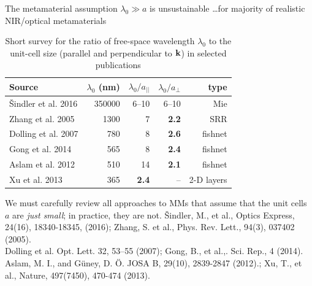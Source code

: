 \documentclass[t]{beamer} \usepackage[english]{babel} \usepackage[utf8]{inputenc} \usetheme{Frankfurt} %
\begin{document}
\begin{frame}{The metamaterial assumption $\lambda_0 \gg a$ is unsustainable}	%
	{\vspace{-.1em}\hfill \ldots for majority of realistic NIR/optical metamaterials}

\vspace{-1em}
\begin{table}[ht]   \caption{Short survey for the ratio of free-space wavelength $\lambda_0$ to the unit-cell size (parallel and perpendicular to ${\mathbf{k}}$) in selected publications}  \label{tb_} \centering 
\begin{tabular}{lrrrr}
\toprule
	Source		 & $\lambda_0$ (nm)	& $\lambda_0/a_{||}$  & $\lambda_0/a_{\perp}$ & type \\
\hline
Šindler et al. 2016  & 350000		&  6--10	& 6--10 & Mie \\
Zhang et al. 2005    & 1300			&  7        & \textbf{2.2}  & SRR \\
Dolling et al. 2007  & 780			&  8		& \textbf{2.6}  & fishnet \\
Gong et al. 2014     & 565			&  8		& \textbf{2.4}  & fishnet \\
Aslam et al. 2012    & 510			&  14		& \textbf{2.1}  & fishnet \\
Xu et al. 2013	     & 365		    & \textbf{2.4}		& --	& 2-D layers \\
\bottomrule
\end{tabular} \end{table}

\vspace{.5em}

We must carefully review all approaches to MMs that assume that the unit cells $a$ are \textit{just small}; in practice, they are not.
	\vfill
	\tiny{	
Šindler, M., et al., Optics Express, 24(16), 18340-18345, (2016);  Zhang, S. et al., Phys. Rev. Lett., 94(3), 037402 (2005).\\
Dolling et al. Opt. Lett. 32, 53–55 (2007); Gong, B., et al.,. Sci. Rep., 4 (2014).\\
Aslam, M. I., and Güney, D. Ö. JOSA B, 29(10), 2839-2847 (2012).; Xu, T., et al., Nature, 497(7450), 470-474  (2013).}
\end{frame} 		%
\end{document}
